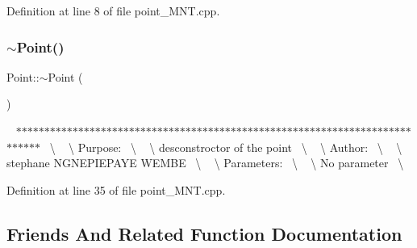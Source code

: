 Definition at line 8 of file point\+\_\+\+M\+N\+T.\+cpp.

\mbox{\label{class_point_a395fa04b4ec126b66fc053f829a30cc1}} 
\subsubsection{\texorpdfstring{$\sim$\+Point()}{~Point()}}
{\footnotesize\ttfamily Point\+::$\sim$\+Point (\begin{DoxyParamCaption}{ }\end{DoxyParamCaption})}

~\newline
$\ast$$\ast$$\ast$$\ast$$\ast$$\ast$$\ast$$\ast$$\ast$$\ast$$\ast$$\ast$$\ast$$\ast$$\ast$$\ast$$\ast$$\ast$$\ast$$\ast$$\ast$$\ast$$\ast$$\ast$$\ast$$\ast$$\ast$$\ast$$\ast$$\ast$$\ast$$\ast$$\ast$$\ast$$\ast$$\ast$$\ast$$\ast$$\ast$$\ast$$\ast$$\ast$$\ast$$\ast$$\ast$$\ast$$\ast$$\ast$$\ast$$\ast$$\ast$$\ast$$\ast$$\ast$$\ast$$\ast$$\ast$$\ast$$\ast$$\ast$$\ast$$\ast$$\ast$$\ast$$\ast$$\ast$$\ast$$\ast$$\ast$$\ast$$\ast$$\ast$$\ast$$\ast$$\ast$$\ast$~\newline
\textbackslash{} ~\newline
\textbackslash{} Purpose\+:~\newline
\textbackslash{} ~\newline
\textbackslash{} desconstroctor of the point~\newline
\textbackslash{} ~\newline
\textbackslash{} Author\+:~\newline
\textbackslash{} ~\newline
\textbackslash{} stephane N\+G\+N\+E\+P\+I\+E\+P\+A\+YE W\+E\+M\+BE~\newline
\textbackslash{} ~\newline
\textbackslash{} Parameters\+:~\newline
\textbackslash{} ~\newline
\textbackslash{} No parameter~\newline
\textbackslash{} ~\newline
 

Definition at line 35 of file point\+\_\+\+M\+N\+T.\+cpp.



\subsection{Friends And Related Function Documentation}
\mbox{\label{class_point_af31c1932671eb01dfe5679f3c2dc6a40}} 
